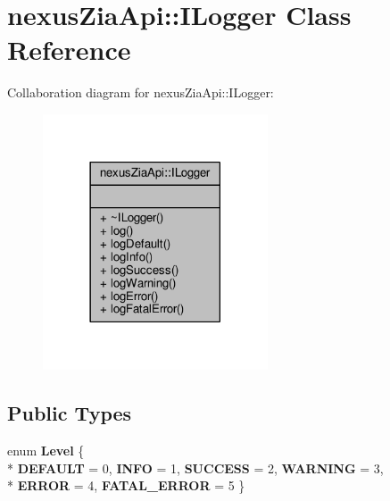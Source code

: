 \hypertarget{classnexusZiaApi_1_1ILogger}{}\section{nexus\+Zia\+Api\+:\+:I\+Logger Class Reference}
\label{classnexusZiaApi_1_1ILogger}


Collaboration diagram for nexus\+Zia\+Api\+:\+:I\+Logger\+:\nopagebreak
\begin{figure}[H]
\begin{center}
\leavevmode
\includegraphics[width=189pt]{classnexusZiaApi_1_1ILogger__coll__graph}
\end{center}
\end{figure}
\subsection*{Public Types}
\begin{DoxyCompactItemize}
\item 
enum {\bfseries Level} \{ \\*
{\bfseries D\+E\+F\+A\+U\+LT} = 0, 
{\bfseries I\+N\+FO} = 1, 
{\bfseries S\+U\+C\+C\+E\+SS} = 2, 
{\bfseries W\+A\+R\+N\+I\+NG} = 3, 
\\*
{\bfseries E\+R\+R\+OR} = 4, 
{\bfseries F\+A\+T\+A\+L\+\_\+\+E\+R\+R\+OR} = 5
 \}\hypertarget{classnexusZiaApi_1_1ILogger_a7e523ee9ecfe0b304c0f43c29fc447b5}{}\label{classnexusZiaApi_1_1ILogger_a7e523ee9ecfe0b304c0f43c29fc447b5}

\end{DoxyCompactItemize}
